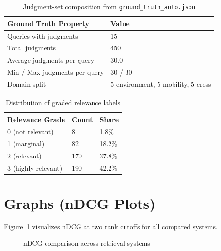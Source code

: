 \documentclass[11pt,a4paper]{article}
\begin{document}
\begin{table}[H]
\centering
\begin{tabular}{p{} p{}}
\toprule
\textbf{Ground Truth Property} & \textbf{Value} \\
\midrule
Queries with judgments & 15 \\
Total judgments & 450 \\
Average judgments per query & 30.0 \\
Min / Max judgments per query & 30 / 30 \\
Domain split & 5 environment, 5 mobility, 5 cross \\
\bottomrule
\end{tabular}
\caption{Judgment-set composition from \texttt{ground_truth_auto.json}}
\end{table}

\begin{table}[H]
\centering
\begin{tabular}{p{} p{} p{}}
\toprule
\textbf{Relevance Grade} & \textbf{Count} & \textbf{Share} \\
\midrule
0 (not relevant) & 8 & 1.8\% \\
1 (marginal) & 82 & 18.2\% \\
2 (relevant) & 170 & 37.8\% \\
3 (highly relevant) & 190 & 42.2\% \\
\bottomrule
\end{tabular}
\caption{Distribution of graded relevance labels}
\end{table}

\section{Graphs (nDCG Plots)}

Figure~\ref{fig:ndcg-bars} visualizes nDCG at two rank cutoffs for all compared systems.

\begin{figure}[H]
\centering
{}
\caption{nDCG comparison across retrieval systems}
\label{fig:ndcg-bars}
\end{figure}
\end{document}
